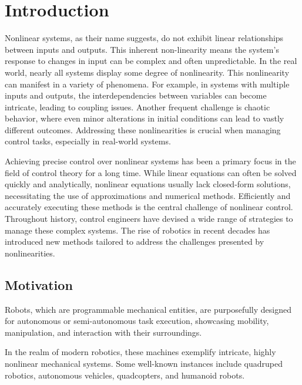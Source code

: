 \chapter{Introduction}
Nonlinear systems, as their name suggests, do not exhibit linear relationships between inputs and outputs. This inherent non-linearity means the system's response to changes in input can be complex and often unpredictable. In the real world, nearly all systems display some degree of nonlinearity. This nonlinearity can manifest in a variety of phenomena. For example, in systems with multiple inputs and outputs, the interdependencies between variables can become intricate, leading to coupling issues. Another frequent challenge is chaotic behavior, where even minor alterations in initial conditions can lead to vastly different outcomes. Addressing these nonlinearities is crucial when managing control tasks, especially in real-world systems.

Achieving precise control over nonlinear systems has been a primary focus in the field of control theory for a long time. While linear equations can often be solved quickly and analytically, nonlinear equations usually lack closed-form solutions, necessitating the use of approximations and numerical methods. Efficiently and accurately executing these methods is the central challenge of nonlinear control. Throughout history, control engineers have devised a wide range of strategies to manage these complex systems. The rise of robotics in recent decades has introduced new methods tailored to address the challenges presented by nonlinearities.

\section{Motivation}
Robots, which are programmable mechanical entities, are purposefully designed for autonomous or semi-autonomous task execution, showcasing mobility, manipulation, and interaction with their surroundings.

In the realm of modern robotics, these machines exemplify intricate, highly nonlinear mechanical systems. Some well-known instances include quadruped robotics\cite{biswal2021development}, autonomous vehicles\cite{schwarting2018planning}, quadcopters\cite{luukkonen2011modelling}, and humanoid robots\cite{saeedvand2019comprehensive}.

